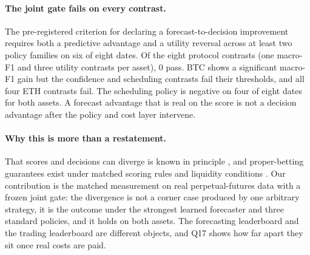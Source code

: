 \paragraph{The joint gate fails on every contrast.} The pre-registered criterion for
declaring a forecast-to-decision improvement requires both a predictive advantage and a
utility reversal across at least two policy families on six of eight dates. Of the eight
protocol contrasts (one macro-F1 and three utility contrasts per asset), $0$ pass. BTC
shows a significant macro-F1 gain but the confidence and scheduling contrasts fail their
thresholds, and all four ETH contrasts fail. The scheduling policy is negative on four of
eight dates for both assets. A forecast advantage that is real on the score is not a
decision advantage after the policy and cost layer intervene.

\paragraph{Why this is more than a restatement.} That scores and decisions can diverge is
known in principle \citep{falezza2026when, raeth2025forecast, f2017murphy,
timo2023evaluating}, and proper-betting guarantees exist under matched scoring rules and
liquidity conditions \citep{anri2026when}. Our contribution is the matched measurement on
real perpetual-futures data with a frozen joint gate: the divergence is not a corner case
produced by one arbitrary strategy, it is the outcome under the strongest learned
forecaster and three standard policies, and it holds on both assets. The forecasting
leaderboard and the trading leaderboard are different objects, and Q17 shows how far apart
they sit once real costs are paid.
